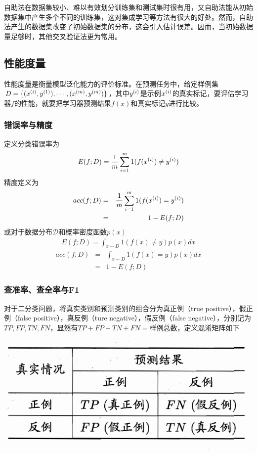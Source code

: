 自助法在数据集较小、难以有效划分训练集和测试集时很有用，又自助法能从初始数据集中产生多个不同的训练集，这对集成学习等方法有很大的好处。然而，自助法产生的数据集改变了初始数据集的分布，这会引入估计误差。因而，当初始数据量足够时，其他交叉验证法更为常用。

\subsection{性能度量}
性能度量是衡量模型泛化能力的评价标准。在预测任务中，给定样例集$D=\{({x}^{({i})},{y}^{({1})}),\cdots,({x}^{({m})},{y}^{({m})})\}$，其中${y}^{({i})}$是示例${x}^{({i})}$的真实标记，要评估学习器$f$的性能，就要把学习器预测结果$f(x)$和真实标记$y$进行比较。 
\subsubsection{错误率与精度}
定义分类错误率为
\begin{eqnarray}
E(f;D)=\frac{1}{m}\sum_{i=1}^m 1(f({x}^{({i})})\neq {y}^{({i})})
\end{eqnarray}
精度定义为
\begin{eqnarray}
acc(f;D)&=&\frac{1}{m}\sum_{i=1}^m 1(f({x}^{({i})})= {y}^{({i})})\\
&=&1-E(f;D)
\end{eqnarray}
或对于数据分布$\mathcal{D}$和概率密度函数$p(x)$
\begin{eqnarray}
E(f;D)=\int_{x\sim D} 1(f(x)\neq y)p(x)dx
\end{eqnarray}
\begin{eqnarray}
acc(f;D)&=&\int_{x\sim D} 1(f(x)= y)p(x)dx\\
&=&1-E(f;D)
\end{eqnarray}
\subsubsection{查准率、查全率与F1}
对于二分类问题，将真实类别和预测类别的组合分为真正例（true positive），假正例（false positive），真反例（ture negative），假反例（false negative），分别记为$TP,FP,TN,FN$，显然有$TP+FP+TN+FN=$样例总数，定义混淆矩阵如下

\begin{center}
\includegraphics[scale=0.5]{../figures/RAMS1.PNG} 
\end{center}

